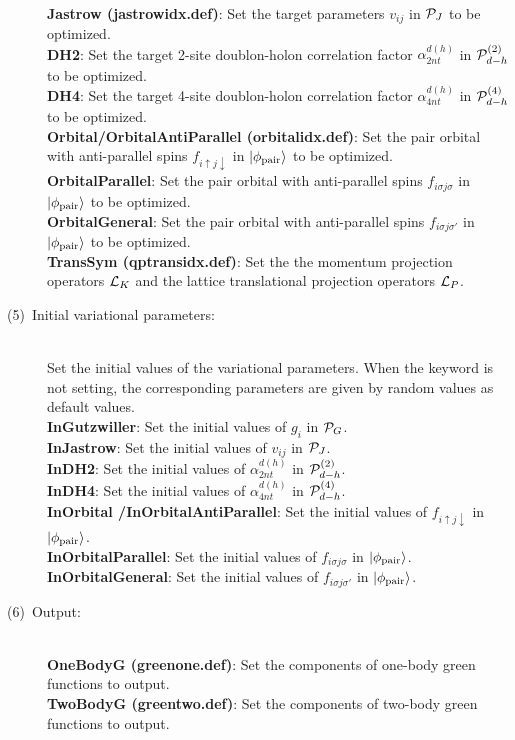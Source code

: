 \begin{description}
~\\{\bf Jastrow (jastrowidx.def)}: Set the target parameters $v_{ij}$ in ${\cal P}_J$ to be optimized.
~\\{\bf DH2}:  Set the target 2-site doublon-holon correlation factor $\alpha_{2nt}^{d(h)}$ in ${\cal P}_{d-h}^{(2)}$ to be optimized.
~\\{\bf DH4}:  Set the target 4-site doublon-holon correlation factor $\alpha_{4nt}^{d(h)}$ in ${\cal P}_{d-h}^{(4)}$ to be optimized.
~\\{\bf Orbital/OrbitalAntiParallel (orbitalidx.def)}: Set the pair orbital with anti-parallel spins $f_{i\uparrow j\downarrow}$ in $|\phi_{\rm pair} \rangle$ to be optimized.
~\\{\bf OrbitalParallel}: Set the pair orbital with anti-parallel spins $f_{i\sigma j\sigma}$ in $|\phi_{\rm pair} \rangle$ to be optimized.
~\\{\bf OrbitalGeneral}: Set the pair orbital with anti-parallel spins $f_{i\sigma j\sigma'}$ in $|\phi_{\rm pair} \rangle$ to be optimized.
~\\{\bf TransSym (qptransidx.def)}: Set the the momentum projection operators ${\cal L}_K$ and the lattice translational projection operators ${\cal L}_P$.

\item[(5)~Initial variational parameters:]
~\\ Set the initial values of the variational parameters. When the keyword is not setting, the corresponding parameters are given by random values as default values.
~\\{\bf InGutzwiller}: Set the initial values of $g_i$ in ${\cal P}_G$.
~\\{\bf InJastrow}: Set the initial values of $v_{ij}$ in ${\cal P}_J$.
~\\{\bf InDH2}:  Set the initial values of $\alpha_{2nt}^{d(h)}$ in ${\cal P}_{d-h}^{(2)}$.
~\\{\bf InDH4}:  Set the initial values of $\alpha_{4nt}^{d(h)}$ in ${\cal P}_{d-h}^{(4)}$.
~\\{\bf InOrbital /InOrbitalAntiParallel}: Set the initial values of $ f_{i\uparrow j\downarrow}$ in $|\phi_{\rm pair} \rangle$.
~\\{\bf InOrbitalParallel}: Set the initial values of $ f_{i\sigma j\sigma}$ in $|\phi_{\rm pair} \rangle$.
~\\{\bf InOrbitalGeneral}: Set the initial values of $ f_{i\sigma j\sigma'}$ in $|\phi_{\rm pair} \rangle$.


\item[(6)~Output:]
~\\{\bf OneBodyG  (greenone.def)}: Set the components of one-body green functions to output.
~\\{\bf TwoBodyG  (greentwo.def)}: Set the components of two-body green functions to output.
\end{description}
